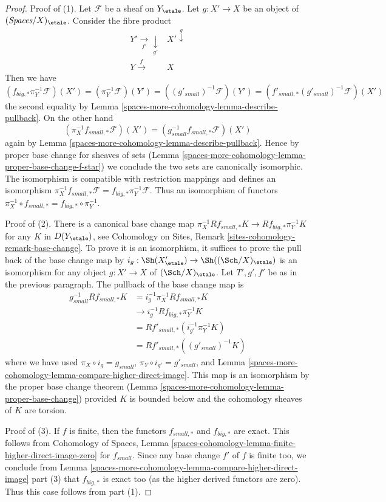 \begin{proof}
Proof of (1). Let $\mathcal{F}$ be a sheaf on $Y_\etale$.
Let $g : X' \to X$ be an object of $(\textit{Spaces}/X)_\etale$.
Consider the fibre product
$$
\begin{array}{cc}Y' \underset{f'}{\longrightarrow}\underset{g'}{\downarrow} & X' \overset{g}{\downarrow} \\ Y \overset{f}{\longrightarrow} & X\end{array}
$$
Then we have
$$
(f_{big, *}\pi_Y^{-1}\mathcal{F})(X') =
(\pi_Y^{-1}\mathcal{F})(Y') =
((g'_{small})^{-1}\mathcal{F})(Y')  =
(f'_{small, *}(g'_{small})^{-1}\mathcal{F})(X')
$$
the second equality by Lemma \ref{spaces-more-cohomology-lemma-describe-pullback}.
On the other hand
$$
(\pi_X^{-1}f_{small, *}\mathcal{F})(X') =
(g_{small}^{-1}f_{small, *}\mathcal{F})(X')
$$
again by Lemma \ref{spaces-more-cohomology-lemma-describe-pullback}.
Hence by proper base change for sheaves of sets
(Lemma \ref{spaces-more-cohomology-lemma-proper-base-change-f-star})
we conclude the two sets are canonically isomorphic.
The isomorphism is compatible with restriction mappings
and defines an isomorphism
$\pi_X^{-1}f_{small, *}\mathcal{F} = f_{big, *}\pi_Y^{-1}\mathcal{F}$.
Thus an isomorphism of functors
$\pi_X^{-1} \circ f_{small, *} = f_{big, *} \circ \pi_Y^{-1}$.

\medskip\noindent
Proof of (2). There is a canonical base change map
$\pi_X^{-1}Rf_{small, *}K \to Rf_{big, *}\pi_Y^{-1}K$
for any $K$ in $D(Y_\etale)$, see
Cohomology on Sites, Remark \ref{sites-cohomology-remark-base-change}.
To prove it is an isomorphism, it suffices to prove the pull back of
the base change map by $i_g : \Sh(X'_\etale) \to \Sh((\Sch/X)_\etale)$
is an isomorphism for any object $g : X' \to X$ of $(\Sch/X)_\etale$.
Let $T', g', f'$ be as in the previous paragraph.
The pullback of the base change map is
\begin{align*}
g_{small}^{-1}Rf_{small, *}K
& =
i_g^{-1}\pi_X^{-1}Rf_{small, *}K \\
& \to
i_g^{-1}Rf_{big, *}\pi_Y^{-1}K \\
& =
Rf'_{small, *}(i_{g'}^{-1}\pi_Y^{-1}K) \\
& =
Rf'_{small, *}((g'_{small})^{-1}K)
\end{align*}
where we have used $\pi_X \circ i_g = g_{small}$,
$\pi_Y \circ i_{g'} = g'_{small}$, and
Lemma \ref{spaces-more-cohomology-lemma-compare-higher-direct-image}.
This map is an isomorphism by the proper base change theorem
(Lemma \ref{spaces-more-cohomology-lemma-proper-base-change}) provided $K$ is bounded
below and the cohomology sheaves of $K$ are torsion.

\medskip\noindent
Proof of (3). If $f$ is finite, then the functors
$f_{small, *}$ and $f_{big, *}$ are exact. This follows
from Cohomology of Spaces, Lemma
\ref{spaces-cohomology-lemma-finite-higher-direct-image-zero}
for $f_{small}$. Since any base change $f'$ of $f$ is finite too,
we conclude from Lemma \ref{spaces-more-cohomology-lemma-compare-higher-direct-image} part (3)
that $f_{big, *}$ is exact too (as the higher derived functors are zero).
Thus this case follows from part (1).
\end{proof}

